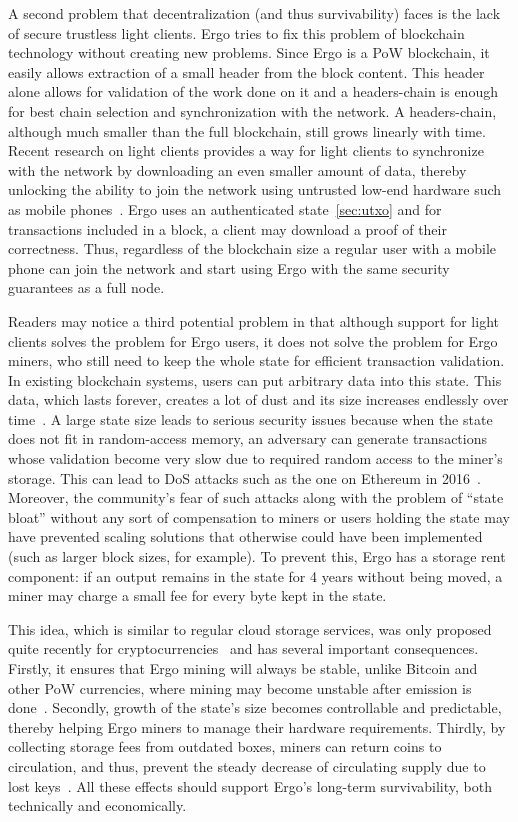 A second problem that decentralization (and thus survivability) faces is the lack of secure trustless light clients. Ergo tries to fix this problem of blockchain technology without creating new problems. Since Ergo is a PoW blockchain, it easily allows extraction of a small header from the block content.
This header alone allows for validation of the work done on it and a headers-chain is enough for best chain selection and synchronization with the network.
A headers-chain, although much smaller than the full blockchain, still grows linearly with time.
Recent research on light clients provides a way for light clients to synchronize with the network by downloading an even smaller amount of data, thereby unlocking the ability to join the network using untrusted low-end hardware such as mobile phones~\cite{kiayias2017non,luuflyclient}.
Ergo uses an authenticated state~\ref{sec:utxo} and for transactions included in a block, a client may download a proof of their correctness.
Thus, regardless of the blockchain size a regular user with
a mobile phone can join the network and start using Ergo with the same security
guarantees as a full node.

Readers may notice a third potential problem in that although support for light clients solves the problem for Ergo users, it does not solve the problem for Ergo miners, who still need to keep the whole state for efficient transaction validation.
In existing blockchain systems, users can put arbitrary data into this state. This data, which lasts forever, creates a lot of dust and its size increases endlessly over time~\cite{perez2019another}.
A large state size leads to serious security issues because when the state does not fit in random-access memory, an adversary can generate transactions whose validation become very slow due to required random access to the miner's storage. This can lead to DoS attacks such as the one on Ethereum in 2016~\cite{ethDos2016}.
Moreover, the community's fear of such attacks along with the problem of ``state bloat'' without any sort of compensation to miners or users holding the state may have prevented scaling solutions that otherwise
could have been implemented (such as larger block sizes, for example).
To prevent this, Ergo has a storage rent component: if an
output remains in the state for 4 years without being moved, a miner may charge a small fee for every
byte kept in the state.

This idea, which is similar to regular cloud storage services, was only proposed quite recently for cryptocurrencies~\cite{chepurnoy2017space} and has several important consequences.
Firstly, it ensures that Ergo mining will always be stable, unlike Bitcoin and other PoW currencies, where mining may become unstable after emission is done~\cite{carlsten2016instability}.
Secondly, growth of the state's size becomes controllable and predictable, thereby helping Ergo miners to manage their hardware requirements.
Thirdly, by collecting storage fees from outdated boxes, miners can return coins to circulation, and thus, prevent the steady decrease of circulating supply due to lost keys~\cite{wsj2018}.
All these effects should support Ergo's long-term survivability, both technically and economically.

